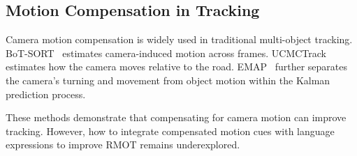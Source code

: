 \documentclass{article}
\begin{document}

\subsection{Motion Compensation in Tracking}
Camera motion compensation is widely used in traditional multi-object tracking. BoT-SORT~\cite{botsort} estimates camera-induced motion across frames. UCMCTrack~\cite{ucmctrack} estimates how the camera moves relative to the road. EMAP~\cite{emap} further separates the camera's turning and movement from object motion within the Kalman prediction process.

These methods demonstrate that compensating for camera motion can improve tracking. However, how to integrate compensated motion cues with language expressions to improve RMOT remains underexplored. 


\end{document}
